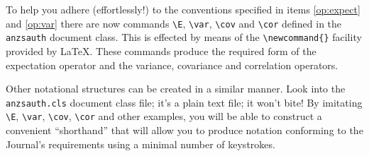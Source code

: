 \documentclass[times, doublespace]{anzsauth}
\begin{document}
To help you adhere (effortlessly!) to the conventions specified
in items \ref{op:expect} and \ref{op:var} there are now commands
\verb!\E!, \verb!\var!, \verb!\cov! and \verb!\cor! defined in the
\texttt{anzsauth} document class.  This is effected by means of the
\verb!\newcommand{}! facility provided by \LaTeX.  These commands
produce the required form of the expectation operator and the
variance, covariance and correlation operators.

Other notational structures can be created in a similar manner.
Look into the \texttt{anzsauth.cls} document class file; it's a plain
text file; it won't bite!  By imitating \verb!\E!, \verb!\var!,
\verb!\cov!, \verb!\cor! and other examples, you will be able to
construct a convenient ``shorthand'' that will allow you to produce
notation conforming to the Journal's requirements using a minimal
number of keystrokes.
\end{document}
